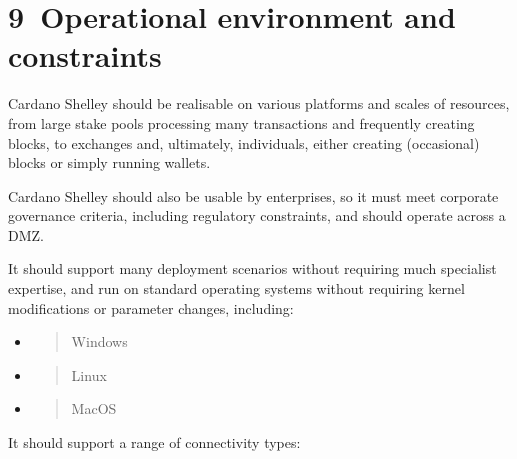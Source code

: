 \documentclass[11pt,a4paper]{article}
\begin{document}
\hypertarget{operational-environment-and-constraints}{%
\section{​9​~Operational environment and
constraints}\label{operational-environment-and-constraints}}

Cardano Shelley should be realisable on various platforms and scales of
resources, from large stake pools processing many transactions and
frequently creating blocks, to exchanges and, ultimately, individuals,
either creating (occasional) blocks or simply running wallets.

Cardano Shelley should also be usable by enterprises, so it must meet
corporate governance criteria, including regulatory constraints, and
should operate across a DMZ.

It should support many deployment scenarios without requiring much
specialist expertise, and run on standard operating systems without
requiring kernel modifications or parameter changes, including:

\begin{itemize}
\item
  \begin{quote}
  Windows
  \end{quote}
\item
  \begin{quote}
  Linux
  \end{quote}
\item
  \begin{quote}
  MacOS
  \end{quote}
\end{itemize}

It should support a range of connectivity types:
\end{document}
